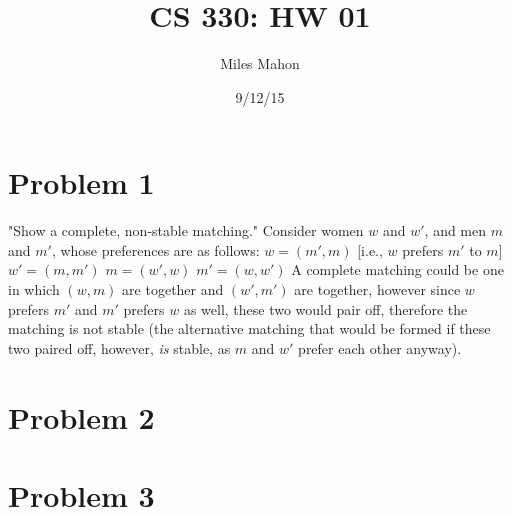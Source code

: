 \documentclass{article}
\begin{document}
\title{CS 330: HW 01}
\date{9/12/15}
\author{Miles Mahon}

\maketitle
{}
\newpage
{}

\section{Problem 1} %
"Show a complete, non-stable matching."
\newline
Consider women $w$ and $w'$, and men $m$ and $m'$, whose preferences are as follows:\newline
\newline
$w = (m',m)$ [i.e., $w$ prefers $m'$ to $m$] \newline
$w' = (m, m')$\newline
$m = (w', w)$\newline
$m' = (w, w')$\newline
\newline
A complete matching could be one in which $(w,m)$ are together and $(w',m')$ are together, however since $w$ prefers $m'$ and $m'$ prefers $w$ as well, these two would pair off, therefore the matching is not stable (the alternative matching that would be formed if these two paired off, however, \textit{is} stable, as $m$ and $w'$ prefer each other anyway).


\section{Problem 2}

\subsection{}%


\section{Problem 3}
\end{document}
